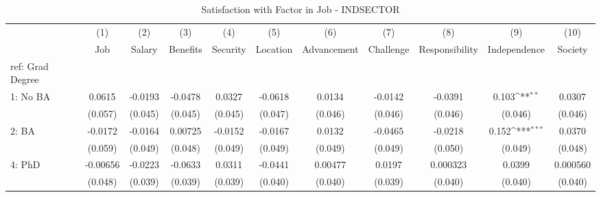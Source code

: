 \begin{table}[htbp]\centering
\def\sym#1{\ifmmode^{#1}\else\(^{#1}\)\fi}
\caption{Satisfaction with Factor in Job - INDSECTOR \label{tab1}}
\begin{tabular}{l*{10}{c}}
\hline\hline
  &\multicolumn{1}{c}{(1)}&\multicolumn{1}{c}{(2)}&\multicolumn{1}{c}{(3)}&\multicolumn{1}{c}{(4)}&\multicolumn{1}{c}{(5)}&\multicolumn{1}{c}{(6)}&\multicolumn{1}{c}{(7)}&\multicolumn{1}{c}{(8)}&\multicolumn{1}{c}{(9)}&\multicolumn{1}{c}{(10)}\\
  &\multicolumn{1}{c}{Job}&\multicolumn{1}{c}{Salary}&\multicolumn{1}{c}{Benefits}&\multicolumn{1}{c}{Security}&\multicolumn{1}{c}{Location}&\multicolumn{1}{c}{Advancement}&\multicolumn{1}{c}{Challenge}&\multicolumn{1}{c}{Responsibility}&\multicolumn{1}{c}{Independence}&\multicolumn{1}{c}{Society}\\
\hline
ref: Grad Degree&                     &                     &                     &                     &                     &                     &                     &                     &                     &                     \\
[1em]
1: No BA&      0.0615         &     -0.0193         &     -0.0478         &      0.0327         &     -0.0618         &      0.0134         &     -0.0142         &     -0.0391         &       0.103\sym{**} &      0.0307         \\
  &     (0.057)         &     (0.045)         &     (0.045)         &     (0.045)         &     (0.047)         &     (0.046)         &     (0.046)         &     (0.046)         &     (0.046)         &     (0.046)         \\
[1em]
2: BA&     -0.0172         &     -0.0164         &     0.00725         &     -0.0152         &     -0.0167         &      0.0132         &     -0.0465         &     -0.0218         &       0.152\sym{***}&      0.0370         \\
  &     (0.059)         &     (0.049)         &     (0.048)         &     (0.049)         &     (0.049)         &     (0.049)         &     (0.049)         &     (0.050)         &     (0.049)         &     (0.048)         \\
[1em]
4: PhD&    -0.00656         &     -0.0223         &     -0.0633         &      0.0311         &     -0.0441         &     0.00477         &      0.0197         &    0.000323         &      0.0399         &    0.000560         \\
  &     (0.048)         &     (0.039)         &     (0.039)         &     (0.039)         &     (0.040)         &     (0.040)         &     (0.039)         &     (0.040)         &     (0.040)         &     (0.040)         \\

\end{tabular}
\end{table}
